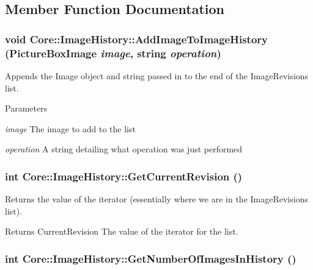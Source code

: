 \subsection{Member Function Documentation}
\hypertarget{class_core_1_1_image_history_ae78f2ce36eb77fb936d1a778e8d9a399}{
\subsubsection[{AddImageToImageHistory}]{\setlength{\rightskip}{0pt plus 5cm}void Core::ImageHistory::AddImageToImageHistory ({\bf PictureBoxImage} {\em image}, \/  string {\em operation})}}
\label{class_core_1_1_image_history_ae78f2ce36eb77fb936d1a778e8d9a399}
Appends the Image object and string passed in to the end of the ImageRevisions list. 
\begin{DoxyParams}{Parameters}
\item[{\em image}]The image to add to the list \item[{\em operation}]A string detailing what operation was just performed \end{DoxyParams}
\hypertarget{class_core_1_1_image_history_a421e672ff9f20e10a03bf989cff4442e}{
\subsubsection[{GetCurrentRevision}]{\setlength{\rightskip}{0pt plus 5cm}int Core::ImageHistory::GetCurrentRevision ()}}
\label{class_core_1_1_image_history_a421e672ff9f20e10a03bf989cff4442e}
Returns the value of the iterator (essentially where we are in the ImageRevisions list). \begin{DoxyReturn}{Returns}
CurrentRevision The value of the iterator for the list. 
\end{DoxyReturn}
\hypertarget{class_core_1_1_image_history_ae26bcfeed34a733dd372896a86bbc3d4}{
\subsubsection[{GetNumberOfImagesInHistory}]{\setlength{\rightskip}{0pt plus 5cm}int Core::ImageHistory::GetNumberOfImagesInHistory ()}}
